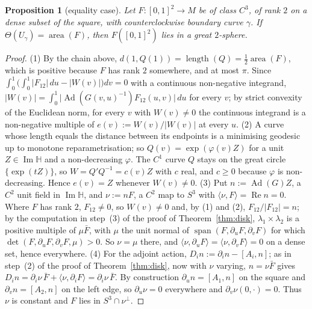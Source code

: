 \documentclass[11pt,reqno]{amsart}
\newtheorem{proposition}[theorem]{Proposition}
\theoremstyle{definition}
\theoremstyle{remark}
\numberwithin{equation}{section}
\newcommand{\HH}{\mathbb{H}}
\newcommand{\Ad}{\operatorname{Ad}}
\newcommand{\re}{\operatorname{Re}}
\newcommand{\im}{\operatorname{Im}}
\newcommand{\ip}[2]{\langle #1,#2\rangle}
\begin{document}
\begin{proposition}[equality case]\label{prop:converse}
Let $F\colon[0,1]^2\to M$ be of class $C^3$, of rank $2$ on a dense subset of the square, with counterclockwise boundary curve $\gamma$.
If $\Theta(U_\gamma)=\operatorname{area}(F)$, then $F([0,1]^2)$ lies in a great $2$-sphere.
\end{proposition}
\begin{proof}
(1) By the chain above, $d(1,Q(1))=\operatorname{length}(Q)=\tfrac12\operatorname{area}(F)$, which is positive because $F$ has rank $2$ somewhere, and at most
$\pi$.  Since $\int_0^1\bigl(\int_0^1\lvert F_{12}\rvert\,du-\lvert W(v)\rvert\bigr)dv=0$ with a continuous non-negative integrand,
$\lvert W(v)\rvert=\int_0^1\lvert\Ad(G(v,u)^{-1})F_{12}(u,v)\rvert\,du$ for every $v$; by strict convexity of the Euclidean norm, for every $v$ with
$W(v)\ne0$ the continuous integrand is a non-negative multiple of $e(v):=W(v)/\lvert W(v)\rvert$ at every $u$.
(2) A curve whose length equals the distance between its endpoints is a minimising geodesic up to monotone reparametrisation; so
$Q(v)=\exp(\varphi(v)Z)$ for a unit $Z\in\im\HH$ and a non-decreasing $\varphi$.  The $C^1$ curve $Q$ stays on the great circle
$\{\exp(tZ)\}$, so $W=Q'Q^{-1}=c(v)Z$ with $c$ real, and $c\ge0$ because $\varphi$ is non-decreasing.  Hence $e(v)=Z$ whenever $W(v)\ne0$.  (3) Put $n:=\Ad(G)Z$, a $C^2$ unit field in $\im\HH$, and $\nu:=nF$, a $C^2$ map to $S^3$ with
$\ip\nu F=\re n=0$.  Where $F$ has rank $2$, $F_{12}\ne0$, so $W(v)\ne0$ and, by (1) and (2), $F_{12}/\lvert F_{12}\rvert=n$; by the computation in step~(3)
of the proof of Theorem~\ref{thm:disk}, $\lambda_1\times\lambda_2$ is a positive multiple of $\mu\bar F$, with $\mu$ the unit normal of
$\operatorname{span}(F,\partial_uF,\partial_vF)$ for which $\det(F,\partial_uF,\partial_vF,\mu)>0$.  So $\nu=\mu$ there, and $\ip\nu{\partial_uF}=\ip\nu{\partial_vF}=0$ on a
dense set, hence everywhere.  (4) For the adjoint action, $D_in:=\partial_in-[A_i,n]$; as in step~(2) of the proof of Theorem~\ref{thm:disk}, now
with $\nu$ varying, $n=\nu\bar F$ gives $D_in=\partial_i\nu\,\bar F+\ip\nu{\partial_iF}=\partial_i\nu\,\bar F$.  By construction $\partial_un=[A_1,n]$ on the square
and $\partial_vn=[A_2,n]$ on the left edge, so $\partial_u\nu=0$ everywhere and $\partial_v\nu(0,\cdot)=0$.  Thus $\nu$ is constant and $F$ lies in
$S^3\cap\nu^\perp$.
\end{proof}
\end{document}
